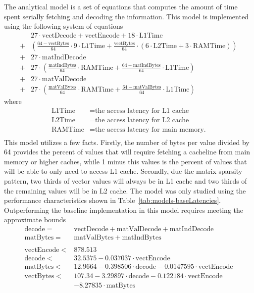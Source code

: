 The analytical model is a set of equations that computes the amount of time spent serially fetching and decoding the information.
This model is implemented using the following system of equations
\begin{align*}
	& 27\cdot \mathrm{vectDecode}+\mathrm{vectEncode} + 18\cdot \mathrm{L1Time} \\
	+ & \left(\frac{64-\mathrm{vectBytes}}{64}\cdot 9\cdot \mathrm{L1Time}+\frac{\mathrm{vectBytes}}{64}\cdot \left(6\cdot \mathrm{L2Time}+3\cdot \mathrm{RAMTime}\right)\right) \\
	+ & 27\cdot\mathrm{matIndDecode} \\
	+ & 27\cdot\left(\frac{\mathrm{matIndBytes}}{64}\cdot\mathrm{RAMTime} + \frac{64-\mathrm{matIndBytes}}{64}\cdot\mathrm{L1Time}\right) \\
	+ & 27\cdot\mathrm{matValDecode} \\
	+ & 27\cdot\left(\frac{\mathrm{matValBytes}}{64}\cdot\mathrm{RAMTime}+\frac{64-\mathrm{matValBytes}}{64}\cdot\mathrm{L1Time}\right)
\end{align*}
where
\begin{align*}
	\mathrm{L1Time} &= \text{the access latency for L1 cache} \\
	\mathrm{L2Time} &= \text{the access latency for L2 cache} \\
	\mathrm{RAMTime} &= \text{the access latency for main memory.} \\
\end{align*}
This model utilizes a few facts.
Firstly, the number of bytes per value divided by 64 provides the percent of values that will require fetching a cacheline from main memory or higher caches, while 1 minus this values is the percent of values that will be able to only need to access L1 cache.
Secondly, due the matrix sparsity pattern, two thirds of vector values will always be in L1 cache and two thirds of the remaining values will be in L2 cache.
The model was only studied using the performance characteristics shown in Table~\ref{tab:models-baseLatencies}.
Outperforming the baseline implementation in this model requires meeting the approximate bounds
\begin{align*}
\mathrm{decode} =& \mathrm{vectDecode} + \mathrm{matValDecode} + \mathrm{matIndDecode} \\
\mathrm{matBytes} =& \mathrm{matValBytes} + \mathrm{matIndBytes}\\
\\
\mathrm{vectEncode} <& 878.513 \\
\mathrm{decode} <& 32.5375 - 0.037037\cdot\mathrm{vectEncode} \\
\mathrm{matBytes} <& 12.9664 - 0.398506\cdot\mathrm{decode}- 0.0147595\cdot\mathrm{vectEncode}\\
\mathrm{vectBytes} <& 107.34  - 3.29897\cdot\mathrm{decode} - 0.122184\cdot\mathrm{vectEncode} \\
	&- 8.27835\cdot\mathrm{matBytes}\\
\end{align*}
